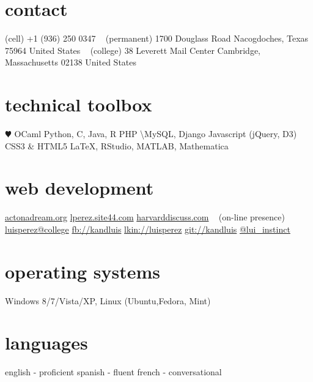 \documentclass[]{friggeri-cv} %
\begin{document}


\begin{aside} %
\section{contact}
(cell)
+1 (936) 250 0347
~
(permanent)
1700 Douglass Road
Nacogdoches, Texas 75964
United States
~
(college)
38 Leverett Mail Center
Cambridge, Massachusetts 02138
United States
\section{technical toolbox}
{\color{red} $\varheartsuit$} OCaml
Python, C, Java, R
PHP \textbackslash MySQL, Django
Javascript (jQuery, D3)
CSS3 \& HTML5
\LaTeX, RStudio, MATLAB, Mathematica
\section{web development}
\href{http://www.actonadream.org/}{actonadream.org}
\href{http://www.lperez.site44.com}{lperez.site44.com}
\href{https://www.hcs.harvard.edu/~harvarddiscuss/index.php/en/}{harvarddiscuss.com}
~
(on-line presence)
\href{mailto:luisperez@college.harvard.edu}{luisperez@college}
\href{http://facebook.com/kandluis}{fb://kandluis}
\href{http://www.linkedin.com/pub/luis-perez/73/793/770}{lkin://luisperez}
\href{http://www.github.com/kandluis}{git://kandluis}
\href{http://www.twitter.com/lui\_instinct}{@lui\_instinct}
\section{operating systems}
Windows 8/7/Vista/XP, Linux (Ubuntu,Fedora, Mint)
\section{languages}
english - proficient
spanish - fluent
french - conversational
\end{aside}

\end{document}
